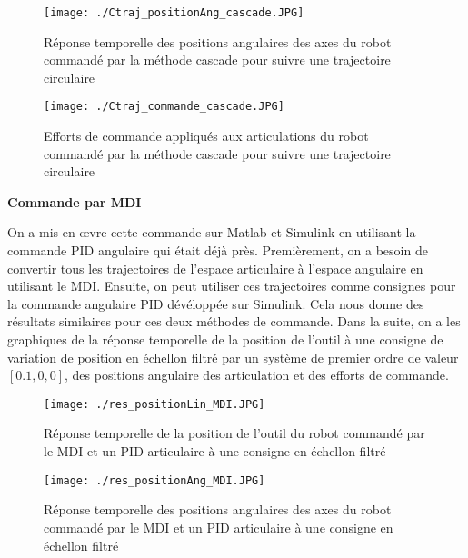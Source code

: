\begin{figure}[H]
	\begin{center}
		\captionsetup{justification=centering,margin=1cm}	
		\texttt{[image: ./Ctraj\_positionAng\_cascade.JPG]}
		\caption{Réponse temporelle des positions angulaires des axes du robot commandé par la méthode cascade pour suivre une trajectoire circulaire}
		\label{fig:Ctraj_positionAng_cascade}
	\end{center}
\end{figure}
\newpage
\begin{figure}[H]
	\begin{center}
		\captionsetup{justification=centering,margin=1cm}	
		\texttt{[image: ./Ctraj\_commande\_cascade.JPG]}
		\caption{Efforts de commande appliqués aux articulations du robot commandé par la méthode cascade pour suivre une trajectoire circulaire}
		\label{fig:Ctraj_commande_cascade}
	\end{center}
\end{figure}


\textbf{Commande par MDI}
\newline

On a mis en \oe{}vre cette commande sur Matlab et Simulink en utilisant la commande PID angulaire qui était déjà près. Premièrement, on a besoin de convertir tous les trajectoires de l'espace articulaire à l'espace angulaire en utilisant le MDI. Ensuite, on peut utiliser ces trajectoires comme consignes pour la commande angulaire PID dévéloppée sur Simulink. Cela nous donne des résultats similaires pour ces deux méthodes de commande. Dans la suite, on a les graphiques de la réponse temporelle de la position de l'outil à une consigne de variation de position en échellon filtré par un système de premier ordre de valeur $ \left[0.1, 0, 0 \right] $, des positions angulaire des articulation et des efforts de commande.

\begin{figure}[H]
	\begin{center}	
		\captionsetup{justification=centering,margin=1cm}
		\texttt{[image: ./res\_positionLin\_MDI.JPG]}
		\caption{Réponse temporelle de la position de l'outil du robot commandé par le MDI et un PID articulaire à une consigne en échellon filtré}
		\label{fig:res_positionLin_MDI}
	\end{center}
\end{figure}

\begin{figure}[H]
	\begin{center}
		\captionsetup{justification=centering,margin=1cm}	
		\texttt{[image: ./res\_positionAng\_MDI.JPG]}
		\caption{Réponse temporelle des positions angulaires des axes du robot commandé par le MDI et un PID articulaire à une consigne en échellon filtré}
		\label{fig:res_positionAng_MDI}
	\end{center}
\end{figure}

